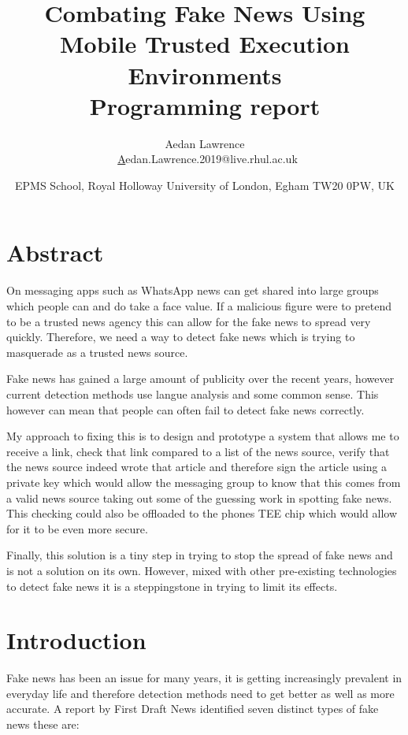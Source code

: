 \documentclass[a4paper, 11pt]{article}
\begin{document}
\title{Combating Fake News Using Mobile Trusted Execution Environments \\ Programming report}
\author{Aedan Lawrence \\\ \href{mailto:aedan.lawrence.2019@live.rhul.ac.uk}Aedan.Lawrence.2019@live.rhul.ac.uk}
\date{EPMS School, Royal Holloway University of London, Egham TW20 0PW, UK}
\begin{titlingpage}
\maketitle
\end{titlingpage}

\tableofcontents
\newpage
\section{Abstract}
On messaging apps such as WhatsApp news can get shared into large groups which people can and do take a face value. If a malicious figure were to pretend to be a trusted news agency this can allow for the fake news to spread very quickly. Therefore, we need a way to detect fake news which is trying to masquerade as a trusted news source. 

Fake news has gained a large amount of publicity over the recent years, however current detection methods use langue analysis and some common sense. This however can mean that people can often fail to detect fake news correctly. 

My approach to fixing this is to design and prototype a system that allows me to receive a link, check that link compared to a list of the news source, verify that the news source indeed wrote that article and therefore sign the article using a private key which would allow the messaging group to know that this comes from a valid news source taking out some of the guessing work in spotting fake news. This checking could also be offloaded to the phones TEE chip which would allow for it to be even more secure. 

Finally, this solution is a tiny step in trying to stop the spread of fake news and is not a solution on its own. However, mixed with other pre-existing technologies to detect fake news it is a steppingstone in trying to limit its effects.
\newpage
\section{Introduction}
Fake news has been an issue for many years, it is getting increasingly prevalent in everyday life and therefore detection methods need to get better as well as more accurate. A report by First Draft News \cite{Fakenews} identified seven distinct types of fake news these are:
\end{document}
